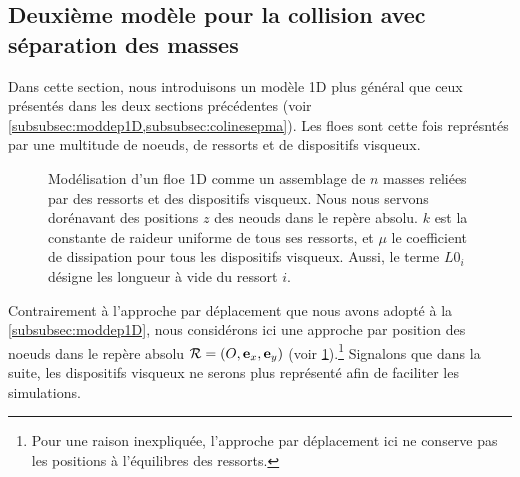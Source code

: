 




\subsection{Deuxième modèle pour la collision avec séparation des masses}
\label{subsec:model1d2}



Dans cette section, nous introduisons un modèle 1D plus général que ceux présentés dans les deux sections précédentes (voir \cref{subsubsec:moddep1D,subsubsec:colinesepma}). Les floes sont cette fois représntés par une multitude de noeuds, de ressorts et de dispositifs visqueux. 
\begin{figure}[!h]
    \centering
    \caption{Modélisation d'un floe 1D comme un assemblage de $n$ masses reliées par des ressorts et des dispositifs visqueux. Nous nous servons dorénavant des positions $z$ des neouds dans le repère absolu. $k$ est la constante de raideur uniforme de tous ses ressorts, et $\mu$ le coefficient de dissipation pour tous les dispositifs visqueux. Aussi, le terme $L0_i$ désigne les longueur à vide du ressort $i$.}
    \label{fig:dep1d4}
\end{figure}
Contrairement à l'approche par déplacement que nous avons adopté à la \cref{subsubsec:moddep1D}, nous considérons ici une approche par position des noeuds dans le repère absolu $\mathcal{R}= (O, \bm{\mathrm{e}}_x, \bm{\mathrm{e}}_y)$ (voir \cref{fig:dep1d4}).\footnote{Pour une raison inexpliquée, l'approche par déplacement ici ne conserve pas les positions à l'équilibres des ressorts.} Signalons que dans la suite, les dispositifs visqueux ne serons plus représenté afin de faciliter les simulations.  

